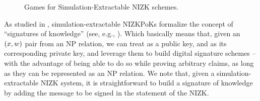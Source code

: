 \begin{figure}[ht!]
\begin{minipage}[t]{0.5\textwidth}
  \end{minipage}
  \label{fig:nizk-games}
  \caption{Games for Simulation-Extractable NIZK schemes.}
\end{figure}

As studied in \cite{cl06}, simulation-extractable NIZKPoKs formalize the concept
of ``signatures of knowledge'' (see, e.g., \cite{cs97}). Which basically means
that, given an $(x,w)$ pair from an NP relation, we can treat \NIZKx
as a public key, and \NIZKw as its corresponding private key, and leverage them
to build digital signature schemes -- with the advantage of being able to do so
while proving arbitrary claims, as long as they can be represented as an NP
relation. We note that, given a simulation-extractable NIZK system, it is
straightforward to build a signature of knowledge by adding the message to be
signed in the statement of the NIZK.

